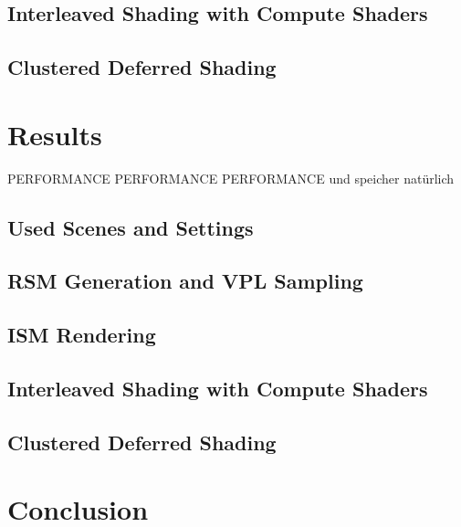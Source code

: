 \section{Interleaved Shading with Compute Shaders}

\section{Clustered Deferred Shading}




\chapter{Results}

PERFORMANCE PERFORMANCE PERFORMANCE
und speicher natürlich
\section{Used Scenes and Settings}

\section{RSM Generation and VPL Sampling}

\section{ISM Rendering}

\section{Interleaved Shading with Compute Shaders}

\section{Clustered Deferred Shading}





\chapter{Conclusion}
